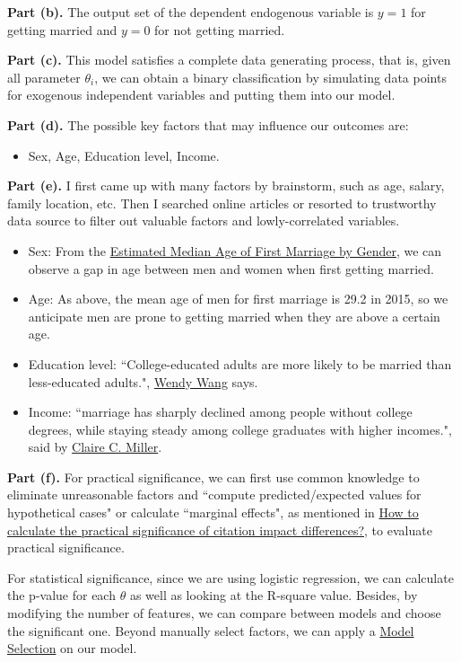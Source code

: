 \documentclass[letterpaper,12pt]{article}
\theoremstyle{definition}
\begin{document}
\textbf{Part (b).} The output set of the dependent endogenous variable is $y=1$ for getting married and $y=0$ for not getting married.

\textbf{Part (c).} This model satisfies a complete data generating process, that is, given all parameter $\theta_i$, we can obtain a binary classification by simulating data points for exogenous independent variables and putting them into our model.

\textbf{Part (d).} The possible key factors that may influence our outcomes are:
\begin{itemize}
\item Sex, Age, Education level, Income.
\end{itemize}

\textbf{Part (e).} I first came up with many factors by brainstorm, such as age, salary, family location, etc. Then I searched online articles or resorted to trustworthy data source to filter out valuable factors and lowly-correlated variables. 
\begin{itemize}
\item Sex: From the \href{https://www.thespruce.com/estimated-median-age-marriage-2303878}{Estimated Median Age of First Marriage by Gender}, we can observe a gap in age between men and women when first getting married.
\item Age: As above, the mean age of men for first marriage is 29.2 in 2015, so we anticipate men are prone to getting married when they are above a certain age.
\item Education level: ``College-educated adults are more likely to be married than less-educated adults.", \href{http://www.pewresearch.org/fact-tank/2015/12/04/education-and-marriage/}{Wendy Wang} says.
\item Income: ``marriage has sharply declined among people without college degrees, while staying steady among college graduates with higher incomes.", said by \href{https://www.nytimes.com/2017/09/25/upshot/how-did-marriage-become-a-mark-of-privilege.html}{Claire C. Miller}.
\end{itemize}

\textbf{Part (f).}
For practical significance, we can first use common knowledge to eliminate unreasonable factors and ``compute predicted/expected values for hypothetical cases" or calculate ``marginal effects", as mentioned in \href{https://arxiv.org/pdf/1301.1799.pdf}{How to calculate the practical significance of citation impact differences?}, to evaluate practical significance.

For statistical significance, since we are using logistic regression, we can calculate the p-value for each $\theta$ as well as looking at the R-square value. Besides, by modifying the number of features, we can compare between models and choose the significant one. Beyond manually select factors, we can apply a \href{http://www.medicine.mcgill.ca/epidemiology/Joseph/courses/EPIB-621/logselect.pdf}{Model Selection} on our model.
\end{document}
